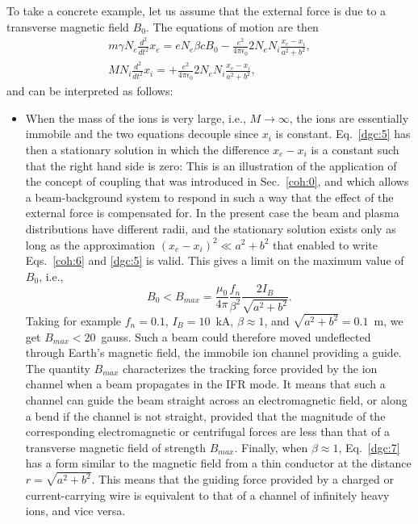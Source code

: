 \documentclass [12pt,a4paper,     ]{report} %
\begin{document}
   To take a concrete example, let us assume that the external force is due to a transverse magnetic field $B_0$.  The equations of motion are then
%
\begin{gather}
\label{dgc:5} %
   m \gamma N_e \frac{d^2}{d t^2} x_e = e N_e \beta c B_0
              - \frac{e^2}{4\pi \epsilon_0} 2 N_e N_i\frac{x_e-x_i}{a^2+b^2},\\
\label{dgc:6} %
   M        N_i \frac{d^2}{d t^2} x_i = 
              + \frac{e^2}{4\pi \epsilon_0} 2 N_e N_i\frac{x_e-x_i}{a^2+b^2},
\end{gather}
%
and can be interpreted as follows:
\begin{itemize}

\item When the mass of the ions is very large, i.e., $M \rightarrow \infty$, the ions are essentially immobile and the two equations decouple since $x_i$ is constant.  Eq.~\eqref{dgc:5} has then a stationary solution in which the difference $x_e-x_i$ is a constant such that the right hand side is zero: This is an illustration of the application of the concept of coupling that was introduced in Sec.~\ref{coh:0}, and which allows a beam-background system to respond in such a way that the effect of the external force is compensated for.  In the present case the beam and plasma distributions have different radii, and the stationary solution exists only as long as the approximation $(x_e-x_i)^2 \ll a^2+b^2$ that enabled to write Eqs.~\eqref{coh:6} and \eqref{dgc:5} is valid.  This gives a limit on the maximum value of $B_0$, i.e., 
%
\begin{equation}\label{dgc:7} %
       B_0 < B_{max} =  \frac{\mu_0}{4 \pi}
                        \frac{f_n}{\beta^2}
                        \frac{2 I_B}{\sqrt{a^2+b^2}}.
\end{equation}
%
Taking for example $f_n = 0.1$, $I_B = 10$~kA, $\beta\approx 1$, and $\sqrt{a^2+b^2} = 0.1$~m, we get $B_{max} < 20$~gauss.  Such a beam could therefore moved undeflected through Earth's magnetic field, the immobile ion channel providing a guide.  The quantity $B_{max}$ characterizes the tracking force provided by the ion channel when a beam propagates in the IFR mode.  It means that such a channel can guide the beam straight across an electromagnetic field, or along a bend if the channel is not straight, provided that the magnitude of the corresponding electromagnetic or centrifugal forces are less than that of a transverse magnetic field of strength $B_{max}$.  Finally, when $\beta\approx 1$, Eq.~\eqref{dgc:7} has a form similar to the magnetic field from a thin conductor at the distance $r=\sqrt{a^2+b^2}$.  This means that the guiding force provided by a charged or current-carrying wire is equivalent to that of a channel of infinitely heavy ions, and vice versa.


\end{itemize}
\end{document}
